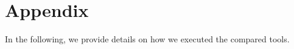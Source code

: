 \chapter{Appendix} \label{ch:appendix}

In the following, we provide details on how we executed the compared tools.



